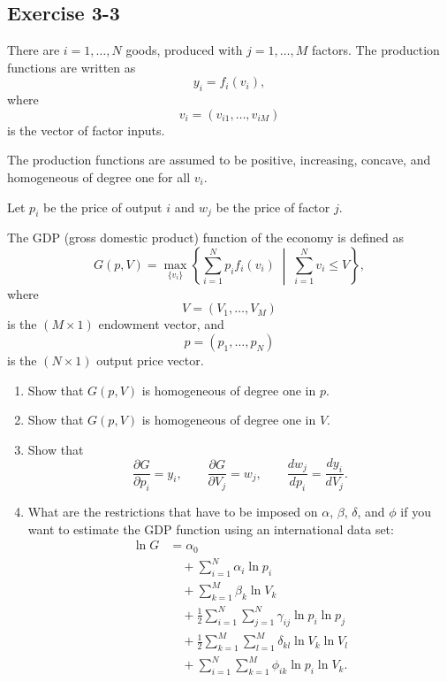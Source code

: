 \begin{tcolorbox}[breakable]

\subsection*{Exercise 3-3}

There are \(i = 1, \dots, N\) goods, produced with \(j = 1, \dots, M\) factors.  
The production functions are written as
\[
y_i = f_i(v_i),
\]
where
\[
v_i = (v_{i1}, \dots, v_{iM})
\]
is the vector of factor inputs.

The production functions are assumed to be positive, increasing, concave, and homogeneous of degree one for all \(v_i\).

Let \(p_i\) be the price of output \(i\) and \(w_j\) be the price of factor \(j\).

The GDP (gross domestic product) function of the economy is defined as
\[
G(p, V) = \max_{\{v_i\}} \left\{ \sum_{i=1}^N p_i f_i(v_i) \;\middle|\; \sum_{i=1}^N v_i \leq V \right\},
\]
where
\[
V = (V_1, \dots, V_M)
\]
is the \((M \times 1)\) endowment vector, and
\[
p = (p_1, \dots, p_N)
\]
is the \((N \times 1)\) output price vector.

\begin{enumerate}
\item[(i)] Show that \(G(p, V)\) is homogeneous of degree one in \(p\).

\item[(ii)] Show that \(G(p, V)\) is homogeneous of degree one in \(V\).

\item[(iii)] Show that
\[
\frac{\partial G}{\partial p_i} = y_i,
\qquad
\frac{\partial G}{\partial V_j} = w_j,
\qquad
\frac{d w_j}{d p_i} = \frac{d y_i}{d V_j}.
\]

\item[(iv)] What are the restrictions that have to be imposed on \(\alpha\), \(\beta\), \(\delta\), and \(\phi\) if you want to estimate the GDP function using an international data set:
\[
\begin{aligned}
\ln G &= \alpha_0 \\
&\quad + \sum_{i=1}^N \alpha_i \ln p_i \\
&\quad + \sum_{k=1}^M \beta_k \ln V_k \\
&\quad + \frac{1}{2} \sum_{i=1}^N \sum_{j=1}^N \gamma_{ij} \ln p_i \ln p_j \\
&\quad + \frac{1}{2} \sum_{k=1}^M \sum_{l=1}^M \delta_{kl} \ln V_k \ln V_l \\
&\quad + \sum_{i=1}^N \sum_{k=1}^M \phi_{ik} \ln p_i \ln V_k.
\end{aligned}
\]


\end{enumerate}
\end{tcolorbox}
